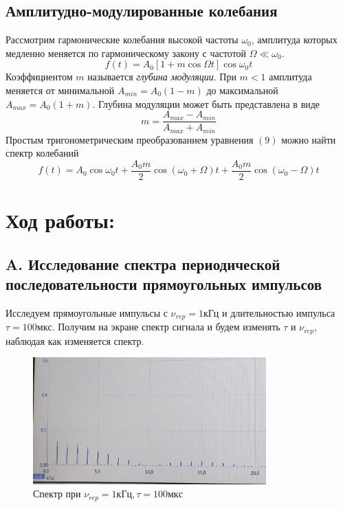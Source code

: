 \documentclass[11pt]{article}
\begin{document}
\subsection*{Амплитудно-модулированные колебания}
Рассмотрим гармонические колебания высокой частоты $\omega_0$, амплитуда которых медленно меняется по гармоническому закону с частотой $\Omega \ll \omega_0$.
\begin{equation}
f(t) = A_0 \left[1+m\cos \Omega t\right] \cos \omega_0 t
\end{equation}
Коэффициентом $m$ называется \textit{глубина модуляции}. При $m < 1$ амплитуда меняется от минимальной $A_{min} = A_0(1-m)$ до максимальной $A_{max} = A_0(1+m)$. Глубина модуляции может быть представлена в виде
\begin{equation}
m = \dfrac{A_{max}-A_{min}}{A_{max}+A_{min}}
\end{equation}
Простым тригонометрическим преобразованием уравнения $(9)$ можно найти спектр колебаний
\begin{equation}
f(t) = A_0 \cos \omega_0t + \dfrac{A_0m}{2} \cos \left(\omega_0 + \Omega\right)t + \dfrac{A_0m}{2}\cos\left(\omega_0 - \Omega\right)t
\end{equation}



\section{Ход работы:}

\subsection{A. Исследование спектра периодической последовательности прямоугольных импульсов}

Исследуем прямоугольные импульсы с \( \nu_{rep} = 1кГц \) и длительностью импульса \( \tau = 100мкс \). Получим на экране спектр сигнала и будем изменять $\tau$ и $\nu_{rep}$, наблюдая как изменяется спектр.

\begin{figure}[H]
    \centering
    \includegraphics[width=0.8\textwidth]{1.jpg}
    \caption{Спектр при \( \nu_{rep} = 1 кГц, \tau = 100мкс \)}
    \label{spec_1}
\end{figure}
\end{document}
